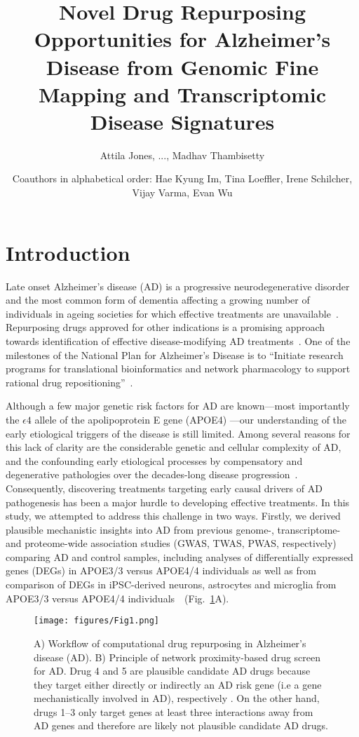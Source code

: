 \documentclass[letterpaper]{article}
\title{Novel Drug Repurposing Opportunities for Alzheimer's Disease from
  Genomic Fine Mapping and Transcriptomic Disease Signatures}
\author{Attila Jones, ..., Madhav Thambisetty}
\date{Coauthors in alphabetical order: Hae Kyung Im, Tina Loeffler, Irene
Schilcher, Vijay Varma, Evan Wu}
\begin{document}
\maketitle
\section{Introduction}

Late onset Alzheimer's disease (AD) is a progressive neurodegenerative disorder and the most
common form of dementia affecting a growing number of individuals in ageing
societies for which effective treatments are
unavailable~\citep{Bondi2017,Masters2015}.  Repurposing drugs approved for other indications is
a promising approach  towards identification of effective disease-modifying AD
treatments~\citep{Pushpakom2019,Fang2021,Taubes2021}.  One of the 
milestones of the National Plan for Alzheimer’s Disease is to ``Initiate
research programs for translational bioinformatics and network pharmacology to
support rational drug repositioning''~\citep{NIH/NIA}.%

Although a few major genetic risk factors for AD are known---most importantly
the $\epsilon 4$ allele of the apolipoprotein E gene (APOE4)
\cite{Yamazaki2019}---our understanding of the early etiological triggers of
the disease is still limited.  Among several reasons for this lack of clarity
are the considerable genetic and cellular complexity of AD, and the
confounding early etiological processes by compensatory and degenerative
pathologies over the decades-long disease progression~\citep{DeStrooper2016}.
Consequently, discovering treatments targeting early causal drivers of AD
pathogenesis has been a major hurdle to developing effective treatments.  In
this study, we attempted to address this challenge in two ways.  Firstly, we
derived plausible mechanistic insights into AD from previous genome-,
transcriptome- and proteome-wide association studies (GWAS, TWAS, PWAS,
respectively)~\citep{Jansen2019,Kunkle2019,Gerring2020,Baird2021,Schwartzentruber2021,Wightman2021,Wingo2021}
comparing AD and control samples, including analyses of differentially
expressed genes (DEGs) in APOE3/3 versus APOE4/4 individuals as
well as from comparison of DEGs in iPSC-derived neurons, astrocytes and
microglia from APOE3/3 versus APOE4/4
individuals~\citep{Taubes2021,Lin2018}~(Fig.~\ref{fig:workflow}A).

\begin{figure}
\texttt{[image: figures/Fig1.png]}
\caption{
  A) Workflow of computational drug repurposing in Alzheimer's disease (AD).
  B) Principle of network proximity-based drug screen for AD.  Drug 4 and 5
  are plausible candidate AD drugs because they target either directly or
  indirectly an AD risk gene (i.e a gene mechanistically involved in AD), respectively .  On the other
  hand, drugs 1--3 only target genes at least three interactions away from AD
  genes and therefore are likely not plausible candidate AD drugs.
}
\label{fig:workflow}
\end{figure}
\end{document}
